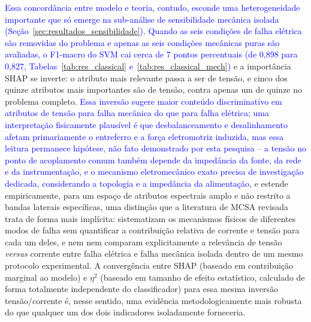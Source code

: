 \documentclass[times,final]{elsarticle}
\begin{document}
\textcolor{blue}{Essa concordância entre modelo e teoria, contudo, esconde uma heterogeneidade importante que só emerge na sub-análise de sensibilidade mecânica isolada (Seção~\ref{sec:resultados_sensibilidade}). Quando as seis condições de falha elétrica são removidas do problema e apenas as seis condições mecânicas puras são avaliadas, o F1-macro do SVM cai cerca de 7 pontos percentuais (de 0,898 para 0,827, Tabelas~\ref{tab:res_classical} e~\ref{tab:res_classical_mech})} e a importância SHAP se inverte: o atributo mais relevante passa a ser de tensão, e cinco dos quinze atributos mais importantes são de tensão, contra apenas um de quinze no problema completo. \textcolor{blue}{Essa inversão sugere maior conteúdo discriminativo em atributos de tensão para falha mecânica do que para falha elétrica; uma interpretação fisicamente plausível é que desbalanceamento e desalinhamento afetam primariamente o entreferro e a força eletromotriz induzida, mas essa leitura permanece hipótese, não fato demonstrado por esta pesquisa -- a tensão no ponto de acoplamento comum também depende da impedância da fonte, da rede e da instrumentação, e o mecanismo eletromecânico exato precisa de investigação dedicada, considerando a topologia e a impedância da alimentação}, e estende empiricamente, para um espaço de atributos espectrais amplo e não restrito a bandas laterais específicas, uma distinção que a literatura de MCSA revisada trata de forma mais implícita: \citet{nandi2005} sistematizam os mecanismos físicos de diferentes modos de falha sem quantificar a contribuição relativa de corrente e tensão para cada um deles, e nem \citet{benamira2022} nem \citet{martinez2022} comparam explicitamente a relevância de tensão \textit{versus} corrente entre falha elétrica e falha mecânica isolada dentro de um mesmo protocolo experimental. A convergência entre SHAP (baseado em contribuição marginal ao modelo) e $\eta^2$ (baseado em tamanho de efeito estatístico, calculado de forma totalmente independente do classificador) para essa mesma inversão tensão/corrente é, nesse sentido, uma evidência metodologicamente mais robusta do que qualquer um dos dois indicadores isoladamente forneceria.
\end{document}
